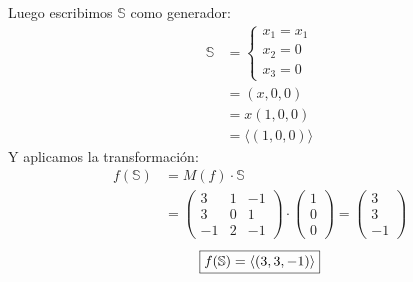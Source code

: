 \documentclass[../practica.root.tex]{subfiles}
\begin{document}
\begin{enumerate}
          Luego escribimos $\mathbb{S}$ como generador:
          \begin{align*}
              \mathbb{S} & =\begin{cases}
                  x_1=x_1 \\
                  x_2=0   \\
                  x_3=0
              \end{cases} \\
                         & =(x, 0, 0)                  \\
                         & =x(1, 0, 0)                 \\
                         & =\langle(1, 0, 0)\rangle
          \end{align*}
          Y aplicamos la transformación:
          \begin{align*}
              f(\mathbb{S}) & =M(f)\cdot\mathbb{S}                                                                    \\
                            & =\begin{pmatrix}
                  3  & 1 & -1 \\
                  3  & 0 & 1  \\
                  -1 & 2 & -1
              \end{pmatrix}\cdot\begin{pmatrix}
                  1 \\
                  0 \\
                  0
              \end{pmatrix} = \begin{pmatrix}
                  3 \\
                  3 \\
                  -1
              \end{pmatrix}
          \end{align*}
          \[ \boxed{f(\S) = \langle(3,3,-1)\rangle} \]


\end{enumerate}
\end{document}

